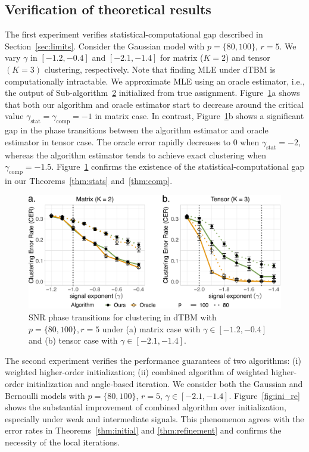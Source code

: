 \documentclass[journal]{IEEEtran}
\theoremstyle{definition}
\theoremstyle{definition}
\begin{document}
\subsection{Verification of theoretical results}\label{subsec:num_theory}

The first experiment verifies  statistical-computational gap described in Section~\ref{sec:limits}. Consider the Gaussian model with $p = \{80, 100\}$, $r = 5$. We vary $\gamma $ in $ [-1.2, -0.4]$ and $[-2.1, -1.4]$ for matrix ($K=2$) and tensor $(K = 3)$ clustering, respectively. Note that finding MLE under dTBM is computationally intractable. We approximate MLE using an oracle estimator, i.e., the output of Sub-algorithm~\hyperref[alg:main]{2} initialized from true assignment. Figure~\ref{fig:phase}a shows that both our algorithm and oracle estimator start to decrease around the critical value $\gamma_{\text{stat}}  = \gamma_{\text{comp}}  = -1$ in matrix case. In contrast, Figure~\ref{fig:phase}b shows a significant gap in the phase transitions between the algorithm estimator and oracle estimator in tensor case. The oracle error rapidly decreases to 0 when $\gamma_{\text{stat}} = -2$, whereas the algorithm estimator tends to achieve exact clustering when $\gamma_{\text{comp}} = -1.5$. Figure~\ref{fig:phase} confirms the existence of the statistical-computational gap in our Theorems~\ref{thm:stats} and~\ref{thm:comp}. 

\begin{figure}[htb]
    \centering
    \includegraphics[width=\columnwidth]{phase_anno3.pdf}
    \caption{SNR phase transitions for clustering in dTBM with $p = \{80, 100\}, r = 5$ under (a) matrix case with $\gamma \in [-1.2, -0.4]$ and (b) tensor case with $ \gamma \in [-2.1, -1.4]$.
    }
    \label{fig:phase}
\end{figure}

The second experiment verifies the performance guarantees of two algorithms: (i) weighted higher-order initialization; (ii) combined algorithm of weighted higher-order initialization and angle-based iteration. We consider both the Gaussian and Bernoulli models with $p = \{80, 100\}$, $r = 5$, $\gamma \in [-2.1, -1.4]$. Figure~\ref{fig:ini_re} shows the substantial improvement of combined algorithm over initialization, especially under weak and intermediate signals. This phenomenon agrees with the error rates in Theorems~\ref{thm:initial} and \ref{thm:refinement} 
and confirms the necessity of the local iterations.
\end{document}
